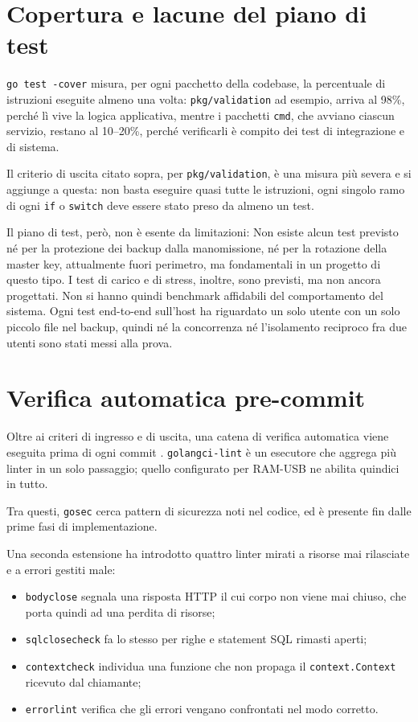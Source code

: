 \section{Copertura e lacune del piano di test}

\texttt{go test -cover} misura, per ogni pacchetto della codebase, la percentuale di istruzioni eseguite
almeno una volta: \texttt{pkg/validation} ad esempio, arriva al 98\%, perché lì vive la logica applicativa,
mentre i pacchetti \texttt{cmd}, che avviano ciascun servizio, restano al 10--20\%, perché verificarli è
compito dei test di integrazione e di sistema.

Il criterio di uscita citato sopra, per \texttt{pkg/validation}, è una misura più severa e si aggiunge a
questa: non basta eseguire quasi tutte le istruzioni, ogni singolo ramo di ogni \texttt{if} o
\texttt{switch} deve essere stato preso da almeno un test.

Il piano di test, però, non è esente da limitazioni:
Non esiste alcun test previsto né per la protezione dei backup dalla manomissione, né per la rotazione della 
master key, attualmente fuori perimetro, ma fondamentali in un progetto di questo tipo. 
I test di carico e di stress, inoltre, sono previsti, ma non ancora progettati. Non si hanno quindi 
benchmark affidabili del comportamento del sistema. 
Ogni test end-to-end sull'host ha riguardato un solo utente con un solo piccolo file nel backup, quindi né 
la concorrenza né l'isolamento reciproco fra due utenti sono stati messi alla prova.

\section{Verifica automatica pre-commit}

Oltre ai criteri di ingresso e di uscita, una catena di verifica automatica viene eseguita prima di ogni
commit \cite{ramusb-contributing}. \texttt{golangci-lint} \cite{golangci-lint} è un esecutore che aggrega
più linter in un solo passaggio; quello configurato per RAM-USB ne abilita quindici in tutto.

Tra questi, \texttt{gosec} \cite{gosec} cerca pattern di sicurezza noti nel codice, ed è presente fin dalle
prime fasi di implementazione.

Una seconda estensione ha introdotto quattro linter mirati a risorse mai rilasciate e a errori gestiti male:

\begin{itemize}
    \item \texttt{bodyclose} \cite{bodyclose} segnala una risposta HTTP il cui corpo non viene mai
    chiuso, che porta quindi ad una perdita di risorse;
    \item \texttt{sqlclosecheck} \cite{sqlclosecheck} fa lo stesso per righe e statement SQL rimasti
    aperti;
    \item \texttt{contextcheck} \cite{contextcheck} individua una funzione che non propaga il
    \texttt{context.Context} ricevuto dal chiamante;
    \item \texttt{errorlint} \cite{errorlint} verifica che gli errori vengano confrontati nel modo
    corretto.
\end{itemize}

